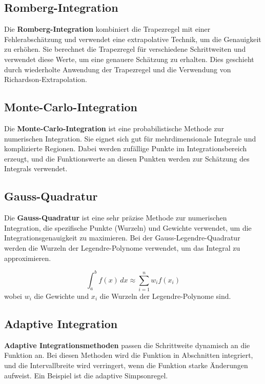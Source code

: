 \subsection*{Romberg-Integration}
Die \textbf{Romberg-Integration} kombiniert die Trapezregel mit einer Fehlerabschätzung und verwendet eine extrapolative Technik, um die Genauigkeit zu erhöhen. Sie berechnet die Trapezregel für verschiedene Schrittweiten und verwendet diese Werte, um eine genauere Schätzung zu erhalten. Dies geschieht durch wiederholte Anwendung der Trapezregel und die Verwendung von Richardson-Extrapolation.

\subsection*{Monte-Carlo-Integration}
Die \textbf{Monte-Carlo-Integration} ist eine probabilistische Methode zur numerischen Integration. Sie eignet sich gut für mehrdimensionale Integrale und komplizierte Regionen. Dabei werden zufällige Punkte im Integrationsbereich erzeugt, und die Funktionswerte an diesen Punkten werden zur Schätzung des Integrals verwendet.

\subsection*{Gauss-Quadratur}
Die \textbf{Gauss-Quadratur} ist eine sehr präzise Methode zur numerischen Integration, die spezifische Punkte (Wurzeln) und Gewichte verwendet, um die Integrationsgenauigkeit zu maximieren. Bei der Gauss-Legendre-Quadratur werden die Wurzeln der Legendre-Polynome verwendet, um das Integral zu approximieren.

\[
\int_{a}^{b} f(x) \,dx \approx \sum_{i=1}^{n} w_i f(x_i)
\]
wobei \(w_i\) die Gewichte und \(x_i\) die Wurzeln der Legendre-Polynome sind.

\subsection*{Adaptive Integration}
\textbf{Adaptive Integrationsmethoden} passen die Schrittweite dynamisch an die Funktion an. Bei diesen Methoden wird die Funktion in Abschnitten integriert, und die Intervallbreite wird verringert, wenn die Funktion starke Änderungen aufweist. Ein Beispiel ist die adaptive Simpsonregel.

